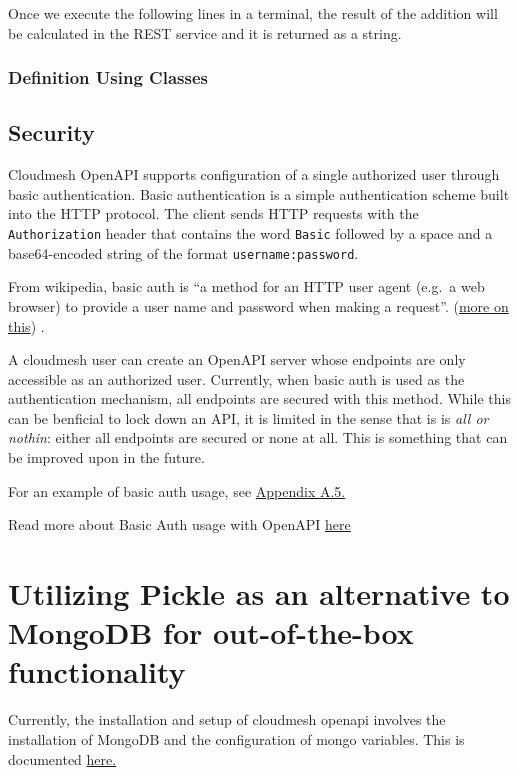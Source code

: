 Once we execute the following lines in a terminal, the result of the
addition will be calculated in the REST service and it is returned as a
string.


\subsubsection{Definition Using Classes}


\subsection{Security}
\label{security}

Cloudmesh OpenAPI supports configuration of a single authorized user
through basic authentication. Basic authentication is a simple
authentication scheme built into the HTTP protocol. The client sends
HTTP requests with the \verb|Authorization| header that contains the
word \verb|Basic| followed by a space and a base64-encoded string of
the format \verb|username:password|.

From wikipedia, basic auth is ``a method for an HTTP user agent (e.g.~a
web browser) to provide a user name and password when making a
request''. (\href{https://github.com/cloudmesh/cloudmesh-openapi}{more
on this}) \cite{cloudmesh-openapi}.

A cloudmesh user can create an OpenAPI server whose endpoints are only
accessible as an authorized user. Currently, when basic auth is used as
the authentication mechanism, all endpoints are secured with this
method. While this can be benficial to lock down an API, it is limited
in the sense that is is {\em all or nothin}: either all endpoints are
secured or none at all. This is something that can be improved upon in
the future.

For an example of basic auth usage, see
\protect\hyperlink{a5-basic-auth-example}{Appendix A.5.}

Read more about Basic Auth usage with OpenAPI
\href{https://swagger.io/docs/specification/authentication/basic-authentication/}{here}

\section{Utilizing Pickle as an alternative to MongoDB for
  out-of-the-box
  functionality}\label{utilizing-pickle-as-an-alternative-to-mongodb-for-out-of-the-box-functionality}

Currently, the installation and setup of cloudmesh openapi involves the
installation of MongoDB and the configuration of mongo variables. This
is documented
\href{https://github.com/cloudmesh/cloudmesh-openapi\#installation}{here.}

